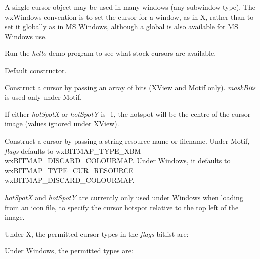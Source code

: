 A single cursor object may be used in many windows (any subwindow type).
The wxWindows convention is to set the cursor for a window, as in X,
rather than to set it globally as in MS Windows, although a
global  is also available for MS Windows use.

Run the {\it hello} demo program to see what stock cursors are
available.



Default constructor.


Construct a cursor by passing an array of bits (XView and Motif only). {\it maskBits} is used only under Motif.

If either {\it hotSpotX} or {\it hotSpotY} is -1, the hotspot will be the centre of the cursor image (values ignored under XView).


Construct a cursor by passing a string resource name or filename.
Under Motif, {\it flags} defaults to wxBITMAP\_TYPE\_XBM \pipe wxBITMAP\_DISCARD\_COLOURMAP. Under Windows,
it defaults to  wxBITMAP\_TYPE\_CUR\_RESOURCE \pipe wxBITMAP\_DISCARD\_COLOURMAP.

{\it hotSpotX} and {\it hotSpotY} are currently only used under Windows when loading from an
icon file, to specify the cursor hotspot relative to the top left of the image.

Under X, the permitted cursor types in the {\it flags} bitlist are:

\begin{twocollist}\itemsep=0pt
\end{twocollist}

Under Windows, the permitted types are:

\begin{twocollist}\itemsep=0pt
\end{twocollist}

